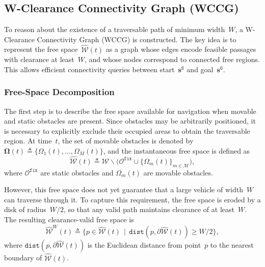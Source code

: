 \subsection{W-Clearance Connectivity Graph (WCCG)}
\label{subsec:wccg}

To reason about the existence of a traversable path of minimum width~$W$,
a W-Clearance Connectivity Graph (WCCG) is constructed. The key idea is to
represent the free space~$\widehat{\mathcal{W}}(t)$ as a graph whose edges
encode feasible passages with clearance at least~$W$, and whose nodes
correspond to connected free regions. This allows efficient connectivity
queries between start~$\mathbf{s}^{\texttt{S}}$ and goal~$\mathbf{s}^{\texttt{G}}$.

\subsubsection{Free-Space Decomposition}
\label{subsubsec:wccg-decomposition}
The first step is to describe the free space available for navigation when
movable and static obstacles are present. Since obstacles may be arbitrarily
positioned, it is necessary to explicitly exclude their occupied areas to
obtain the traversable region. At time~$t$, the set of movable obstacles is
denoted by $\boldsymbol{\Omega}(t)\triangleq \{\Omega_1(t),\ldots,\Omega_M(t)\}$,
and the instantaneous free space is defined as
\begin{equation}\label{eq:free-space}
  \widehat{\mathcal{W}}(t) \triangleq
  \mathcal{W}\backslash
  \big(\mathcal{O}^{\texttt{fix}}\cup \{\Omega_m(t)\}_{m\in\mathcal{M}}\big),
\end{equation}
where $\mathcal{O}^{\texttt{fix}}$ are static obstacles and
$\Omega_m(t)$ are movable obstacles.

However, this free space does not yet guarantee that a large vehicle of width~$W$
can traverse through it. To capture this requirement, the free space is eroded
by a disk of radius~$W/2$, so that any valid path maintains clearance of at
least~$W$. The resulting clearance-valid free space is
\begin{equation}\label{eq:clearance-space}
  \widehat{\mathcal{W}}^{W}(t)\triangleq
  \{p\in\widehat{\mathcal{W}}(t)\,\mid\,
  \texttt{dist}(p,\partial\widehat{\mathcal{W}}(t))\geq W/2\},
\end{equation}
where $\texttt{dist}(p,\partial\widehat{\mathcal{W}}(t))$ is the Euclidean
distance from point~$p$ to the nearest boundary of $\widehat{\mathcal{W}}(t)$.

